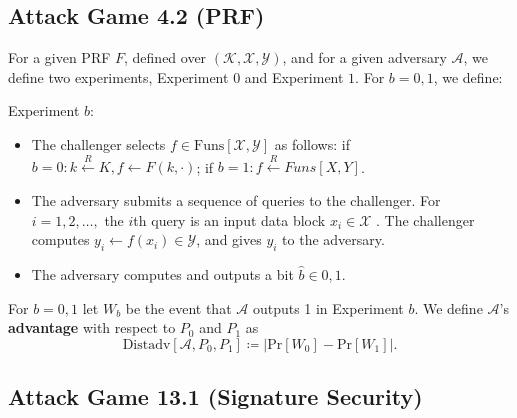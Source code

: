 \subsection{Attack Game 4.2 (PRF)} \label{ag:4-2}

For a given PRF $F$, defined over $(\mathcal{K}, \mathcal{X} , \mathcal{Y})$, and for a given adversary $\mathcal{A}$, we define two experiments, Experiment $0$ and Experiment $1$. For $b = 0,1$, we define:

Experiment $b$:
\begin{itemize}
    \item The challenger selects $f \in \text{Funs}[\mathcal{X},\mathcal{Y}]$ as follows:
        if $b = 0: k \overset{R}{\leftarrow} K, f\leftarrow F(k, ·)$;
        if $b = 1: f \overset{R}{\leftarrow} Funs[X , Y]$.

    \item 
The adversary submits a sequence of queries to the challenger.
For $i = 1, 2,\ldots,$ the $i$th query is an input data block $x_{i} \in \mathcal{X}$ .
The challenger computes $y_{i}\leftarrow f(x_{i})\in \mathcal{Y}$, and gives $y_{i}$ to the adversary.
\item
The adversary computes and outputs a bit $\hat{b}\in {0,1}$.
\end{itemize}

For $b = 0,1$ let $W_b$ be the event that $\mathcal{A}$ outputs 1 in Experiment $b$.
We define $\mathcal{A}$'s \textbf{advantage} with respect to $P_0$ and $P_1$ as
\begin{equation*}
    \text{Distadv}[\mathcal{A}, P_0, P_1] \coloneqq \left\vert \text{Pr}[W_0] - \text{Pr}[W_1] \right\vert.
\end{equation*}

\subsection{Attack Game 13.1 (Signature Security)} \label{ag:13-1}

